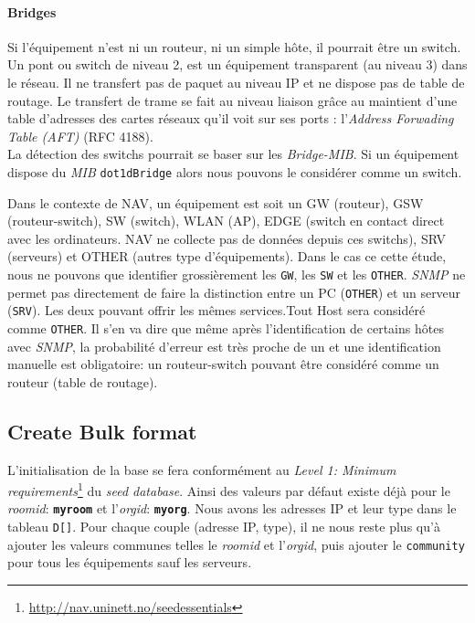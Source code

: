 \paragraph{Bridges\\}
Si l'équipement n'est ni un routeur, ni un simple hôte, il pourrait être un switch.\\
Un pont ou switch de niveau 2, est un équipement transparent (au niveau 3) dans le réseau. Il ne transfert pas de paquet au niveau IP et ne dispose pas de table de routage. Le transfert de trame se fait au niveau liaison grâce au maintient d'une                                                 table d'adresses des cartes réseaux qu'il voit sur ses ports : l'\emph{Address Forwading Table (AFT)} (RFC 4188).\\
La détection des switchs pourrait se baser sur les \emph{Bridge-MIB}. Si un équipement dispose du \emph{MIB} \texttt{dot1dBridge} alors nous pouvons le considérer comme un switch.


Dans le contexte de NAV, un équipement est soit un GW (routeur), GSW (routeur-switch), SW (switch), WLAN (AP), EDGE (switch en contact direct avec les ordinateurs. NAV ne collecte pas de données depuis ces switchs), SRV (serveurs) et OTHER (autres type d'équipements). Dans le cas ce cette étude, nous ne pouvons que identifier grossièrement les \texttt{GW}, les \texttt{SW} et les \texttt{OTHER}. \emph{SNMP} ne permet pas directement de faire la distinction entre un PC (\texttt{OTHER}) et un serveur (\texttt{SRV}). Les deux pouvant offrir les mêmes services.Tout Host sera considéré comme \texttt{OTHER}. Il s'en va dire que même après l'identification de certains hôtes avec \emph{SNMP}, la probabilité d'erreur est très proche de un et une identification manuelle est obligatoire: un routeur-switch pouvant être considéré comme un routeur (table de routage).




\subsection{Create Bulk format}
L'initialisation de la base se fera conformément au \emph{Level 1: Minimum requirements}\footnote{\url{http://nav.uninett.no/seedessentials}} du \emph{seed database}. Ainsi des valeurs par défaut existe déjà pour le \emph{roomid}: \textbf{\texttt{myroom}} et l'\emph{orgid}: \textbf{\texttt{myorg}}. Nous avons les adresses IP et leur type dans le tableau \texttt{D[]}. Pour chaque couple (adresse IP, type), il ne nous reste plus qu'à ajouter les valeurs communes telles le \emph{roomid} et l'\emph{orgid}, puis ajouter le \texttt{community} pour tous les équipements sauf les serveurs. 

